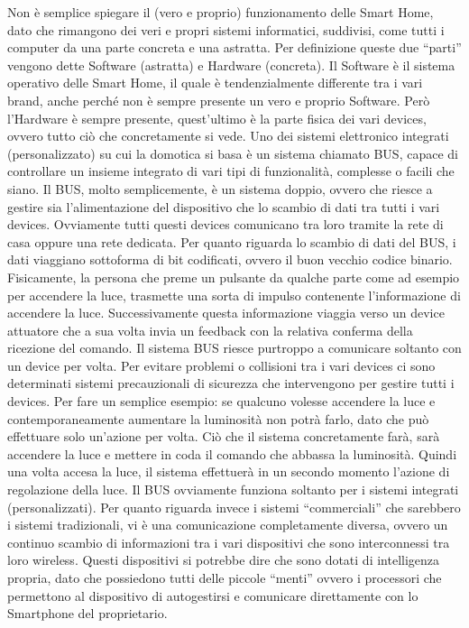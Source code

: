 Non è semplice spiegare il (vero e proprio) funzionamento delle Smart Home, dato che rimangono dei veri e propri sistemi informatici, suddivisi, come tutti i computer da una parte concreta e una astratta. Per definizione queste due “parti” vengono dette Software (astratta) e Hardware (concreta). Il Software è il sistema operativo delle Smart Home, il quale è tendenzialmente differente tra i vari brand, anche perché non è sempre presente un vero e proprio Software. Però l’Hardware è sempre presente, quest’ultimo è la parte fisica dei vari devices, ovvero tutto ciò che concretamente si vede. Uno dei sistemi elettronico integrati (personalizzato) su cui la domotica si basa è un sistema chiamato BUS, capace di controllare un insieme integrato di vari tipi di funzionalità, complesse o facili che siano. Il BUS, molto semplicemente, è un sistema doppio, ovvero che riesce a gestire sia l’alimentazione del dispositivo che lo scambio di dati tra tutti i vari devices. Ovviamente tutti questi devices comunicano tra loro tramite la rete di casa oppure una rete dedicata. 
Per quanto riguarda lo scambio di dati del BUS, i dati viaggiano sottoforma di bit codificati, ovvero il buon vecchio codice binario. 
Fisicamente, la persona che preme un pulsante da qualche parte come ad esempio per accendere la luce, trasmette una sorta di impulso contenente l’informazione di accendere la luce. Successivamente questa informazione viaggia verso un device attuatore che a sua volta invia un feedback con la relativa conferma della ricezione del comando.
Il sistema BUS riesce purtroppo a comunicare soltanto con un device per volta. Per evitare problemi o collisioni tra i vari devices ci sono determinati sistemi precauzionali di sicurezza che intervengono per gestire tutti i devices. Per fare un semplice esempio: se qualcuno volesse accendere la luce e contemporaneamente aumentare la luminosità non potrà farlo, dato che può effettuare solo un’azione per volta. Ciò che il sistema concretamente farà, sarà accendere la luce e mettere in coda il comando che abbassa la luminosità. Quindi una volta accesa la luce, il sistema effettuerà in un secondo momento l’azione di regolazione della luce. Il BUS ovviamente funziona soltanto per i sistemi integrati (personalizzati). Per quanto riguarda invece i sistemi “commerciali” che sarebbero i sistemi tradizionali, vi è una comunicazione completamente diversa, ovvero un continuo scambio di informazioni tra i vari dispositivi che sono interconnessi tra loro wireless. Questi dispositivi si potrebbe dire che sono dotati di intelligenza propria, dato che possiedono tutti delle piccole “menti” ovvero i processori che permettono al dispositivo di autogestirsi e comunicare direttamente con lo Smartphone del proprietario. 
